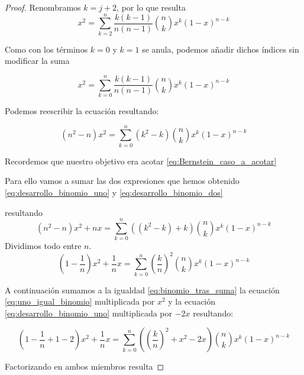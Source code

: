 \begin{proof}
    Renombramos $k= j+2$, por lo que resulta
    \begin{equation}
        x^2 = \sum_{k=2}^{n} \frac{k(k-1)}{n(n-1)} \binom{n}{k} x^{k} (1-x)^{n-k}
    \end{equation}

    Como con los términos $k=0$ y $k=1$ se anula, podemos añadir dichos índices sin modificar la suma 
    
    \begin{equation}
        x^2 = \sum_{k=0}^{n} \frac{k(k-1)}{n(n-1)} \binom{n}{k} x^{k} (1-x)^{n-k}
    \end{equation}

    Podemos reescribir la ecuación resultando: 

    \begin{equation} \label{eq:desarrollo_binomio_dos}
      (n^2 - n)  x^2 = \sum_{k=0}^{n} (k^2 - k) \binom{n}{k} x^{k} (1-x)^{n-k}
    \end{equation}
    
    

Recordemos que nuestro objetivo era acotar \ref{eq:Bernstein_caso_a_acotar}

Para ello vamos a sumar las dos expresiones que hemos obtenido
 \eqref{eq:desarrollo_binomio_uno} y \eqref{eq:desarrollo_binomio_dos}

 resultando 
 \begin{equation} 
    (n^2 - n)  x^2 + nx= \sum_{k=0}^{n} ((k^2 - k)+k) \binom{n}{k} x^{k} (1-x)^{n-k}
  \end{equation}
  Dividimos todo entre $n$. 
  \begin{equation} \label{eq:binomio_tras_suma}
    (1 - \frac{1}{n})  x^2 + \frac{1}{n}x= \sum_{k=0}^{n} \left( \frac{k}{n} \right)^2 \binom{n}{k} x^{k} (1-x)^{n-k}
  \end{equation}

  A continuación sumamos a la igualdad \eqref{eq:binomio_tras_suma} la ecuación \eqref{eq:uno_igual_binomio} multiplicada por $x^2$ y la ecuación \eqref{eq:desarrollo_binomio_uno}
  multiplicada por $-2x$ resultando: 


  \begin{equation} 
    (1 - \frac{1}{n} + 1 -2)  x^2 + \frac{1}{n}x= \sum_{k=0}^{n} \left( \left( \frac{k}{n} \right)^2 + x^2 -2x \right) \binom{n}{k} x^{k} (1-x)^{n-k}
  \end{equation}

  Factorizando en ambos miembros resulta


\end{proof}
